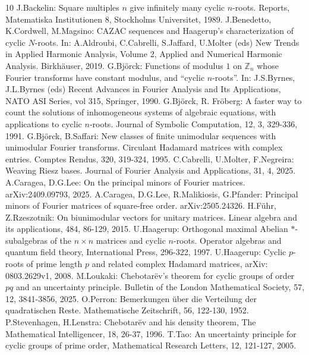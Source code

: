 \documentclass[A4,11pt]{article}
\begin{document}
{\small
\begin{thebibliography}{10}
 J.Backelin: Square multiples $n$ give infinitely many cyclic $n$-roots. Reports, Matematiska Institutionen 8, Stockholms Universitet, 1989.
 J.Benedetto, K.Cordwell, M.Magsino: CAZAC sequences and Haagerup’s characterization of cyclic $N$-roots. In: A.Aldroubi, C.Cabrelli, S.Jaffard, U.Molter (eds) New Trends in Applied Harmonic Analysis, Volume 2, Applied and Numerical Harmonic Analysis. Birkh{\"a}user, 2019.
 G.Bj{\"o}rck: Functions of modulus $1$ on $\mathbb Z_n$ whose Fourier transforms have constant modulus, and ``cyclic $n$-roots''. In: J.S.Byrnes, J.L.Byrnes (eds) Recent Advances in Fourier Analysis and Its Applications, NATO ASI Series, vol 315, Springer, 1990. 
 G.Bj{\"o}rck, R. Fr{\"o}berg: A faster way to count the solutions of inhomogeneous systems of algebraic equations, with applications to cyclic $n$-roots. Journal of Symbolic Computation, 12, 3, 329-336, 1991.
 G.Bj{\"o}rck, B.Saffari: New classes of finite unimodular sequences with unimodular Fourier transforms. Circulant Hadamard matrices with complex entries. Comptes Rendus, 320, 319-324, 1995.
 C.Cabrelli, U.Molter, F.Negreira: Weaving Riesz bases. Journal of Fourier Analysis and Applications, 31, 4, 2025.
 A.Caragea, D.G.Lee: On the principal minors of Fourier matrices. arXiv:2409.09793, 2025.
 A.Caragea, D.G.Lee, R.Malikiosis, G.Pfander: Principal minors of Fourier matrices of square-free order. arXiv:2505.24326.
 H.F{\"u}hr, Z.Rzeszotnik: On biunimodular vectors for unitary matrices. Linear algebra and its applications, 484, 86-129, 2015.
 U.Haagerup: Orthogonal maximal Abelian $\ast$-subalgebras of the $n\times n$ matrices and cyclic $n$-roots. Operator algebras and quantum field theory, International Press, 296-322, 1997. 
 U.Haagerup: Cyclic $p$-roots of prime length $p$ and related complex Hadamard matrices, arXiv: 0803.2629v1, 2008.
 M.Loukaki: Chebotar\"ev's theorem for cyclic groups of order $pq$ and an uncertainty principle. Bulletin of the London Mathematical Society, 57, 12, 3841-3856, 2025.
 O.Perron: Bemerkungen über die Verteilung der quadratischen Reste. Mathematische Zeitschrift, 56, 122-130, 1952.
 P.Stevenhagen, H.Lenstra: Chebotar\"ev and his density theorem, The Mathematical Intelligencer, 18, 26-37, 1996.
 T.Tao: An uncertainty principle for cyclic groups of prime order, Mathematical Research Letters, 12, 121-127, 2005. 
\end{thebibliography}} 
\end{document}
